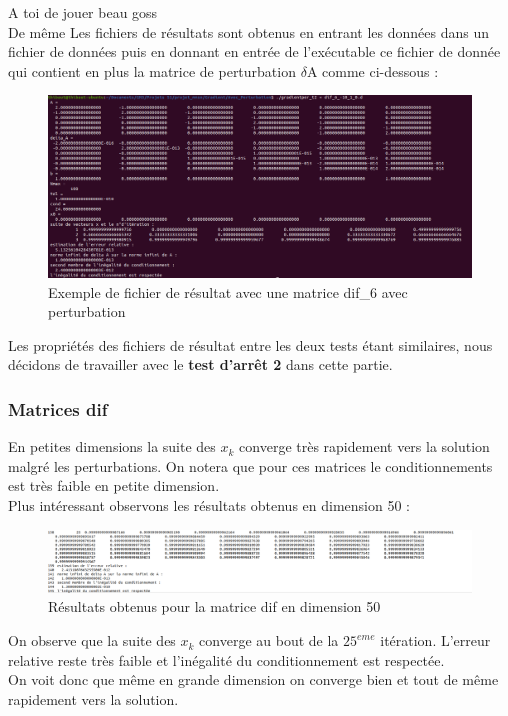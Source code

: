 \documentclass[12,french]{report}
\begin{document}
A toi de jouer beau goss \\
De même Les fichiers de résultats sont obtenus en entrant les données dans un fichier de données puis en donnant en entrée de l’exécutable ce fichier de donnée qui contient en plus la matrice de perturbation $\delta$A comme ci-dessous :
\begin{figure}[H]
	\centering
	\includegraphics[width=1\textwidth]{./Images/dif_6_1.res}
	\caption{Exemple de fichier de résultat avec une matrice dif\_6 avec perturbation}
\end{figure}

Les propriétés des fichiers de résultat entre les deux tests étant similaires, nous décidons de travailler avec le \textbf{test d'arrêt 2} dans cette partie.

\subsubsection{Matrices dif}
En petites dimensions la suite des $x_{k}$
converge très rapidement vers la solution malgré les perturbations. On notera que pour ces matrices le conditionnements est très faible en petite dimension.\\
Plus intéressant observons les résultats obtenus en dimension 50 :\\

\begin{figure}[H]
	\centering
	\includegraphics[width=1.23\textwidth]{./Images/dif_50_1.res}
	\caption{Résultats obtenus pour la matrice dif en dimension 50}
\end{figure}

On observe que la suite des $x_{k}$ converge au bout de la $25^{eme}$ itération. L'erreur relative reste très faible et l'inégalité du conditionnement est respectée.\\
On voit donc que même en grande dimension on converge bien et tout de même rapidement vers la solution.
\end{document}
